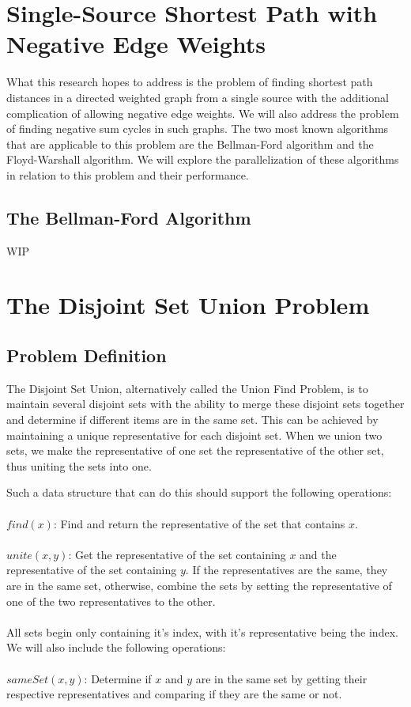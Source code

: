 \documentclass[conference]{IEEEtran}
\begin{document}
\section{Single-Source Shortest Path with Negative Edge Weights}
What this research hopes to address is the problem of finding shortest path distances in a directed weighted graph from a single source with the additional complication of allowing negative edge weights. We will also address the problem of finding negative sum cycles in such graphs. The two most known algorithms that are applicable to this problem are the Bellman-Ford algorithm and the Floyd-Warshall algorithm. We will explore the parallelization of these algorithms in relation to this problem and their performance.

\subsection{The Bellman-Ford Algorithm}\label{AA}
WIP



\section{The Disjoint Set Union Problem}

\subsection{Problem Definition}
The Disjoint Set Union, alternatively called the Union Find Problem, is to maintain several disjoint sets with the ability to merge these disjoint sets together and determine if different items are in the same set. This can be achieved by maintaining a unique representative for each disjoint set. When we union two sets, we make the representative of one set the representative of the other set, thus uniting the sets into one.

Such a data structure that can do this should support the following operations: \\ \\
$find(x)$: Find and return the representative of the set that contains $x$. \\ \\
$unite(x, y)$: Get the representative of the set containing $x$ and the representative of the set containing $y$. If the representatives are the same, they are in the same set, otherwise, combine the sets by setting the representative of one of the two representatives to the other. \\ \\
All sets begin only containing it's index, with it's representative being the index. We will also include the following operations: \\ \\
$sameSet(x, y)$: Determine if $x$ and $y$ are in the same set by getting their respective representatives and comparing if they are the same or not.
\end{document}

